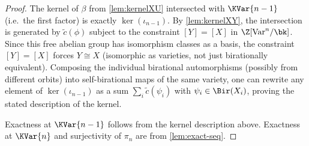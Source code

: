 \begin{proof}
  The kernel of \(\beta\) from \cref{lem:kernelXU} intersected with \(\KVar{n-1}\)
  (i.e.\ the first factor) is exactly \(\ker(\iota_{n-1})\).  By \cref{lem:kernelXY},
  the intersection is generated by \(\tilde{c}(\phi)\) subject to the constraint
  \([Y] = [X]\) in \(\Z[\mathrm{Var}^n/\bk]\).  Since this free abelian group has
  isomorphism classes as a basis, the constraint \([Y] = [X]\) forces \(Y \cong X\)
  (isomorphic as varieties, not just birationally equivalent).  Composing the
  individual birational automorphisms (possibly from different orbits) into
  self-birational maps of the same variety, one can rewrite any element of
  \(\ker(\iota_{n-1})\) as a sum \(\sum_i \tilde{c}(\psi_i)\) with
  \(\psi_i \in \Bir(X_i)\), proving the stated description of the kernel.

  Exactness at \(\KVar{n-1}\) follows from the kernel description above.  Exactness
  at \(\KVar{n}\) and surjectivity of \(\pi_n\) are from \cref{lem:exact-seq}.
\end{proof}
